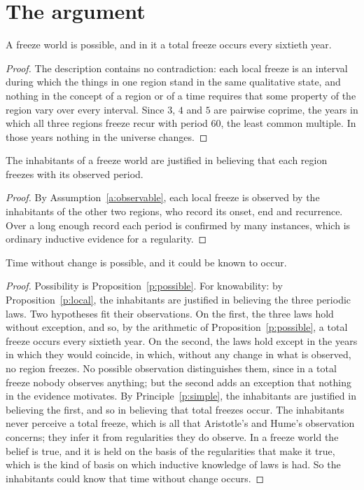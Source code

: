 \documentclass{situationist-preprint}
\begin{document}
\section{The argument}

\begin{proposition}\label{p:possible}
A freeze world is possible, and in it a total freeze occurs every sixtieth year.
\end{proposition}

\begin{proof}
The description contains no contradiction: each local freeze is an interval during which the things in one region stand in the same qualitative state, and nothing in the concept of a region or of a time requires that some property of the region vary over every interval. Since $3$, $4$ and $5$ are pairwise coprime, the years in which all three regions freeze recur with period $60$, the least common multiple. In those years nothing in the universe changes.
\end{proof}

\begin{proposition}\label{p:local}
The inhabitants of a freeze world are justified in believing that each region freezes with its observed period.
\end{proposition}

\begin{proof}
By Assumption~\ref{a:observable}, each local freeze is observed by the inhabitants of the other two regions, who record its onset, end and recurrence. Over a long enough record each period is confirmed by many instances, which is ordinary inductive evidence for a regularity.
\end{proof}

\begin{theorem}\label{t:main}
Time without change is possible, and it could be known to occur.
\end{theorem}

\begin{proof}
Possibility is Proposition~\ref{p:possible}. For knowability: by Proposition~\ref{p:local}, the inhabitants are justified in believing the three periodic laws. Two hypotheses fit their observations. On the first, the three laws hold without exception, and so, by the arithmetic of Proposition~\ref{p:possible}, a total freeze occurs every sixtieth year. On the second, the laws hold except in the years in which they would coincide, in which, without any change in what is observed, no region freezes. No possible observation distinguishes them, since in a total freeze nobody observes anything; but the second adds an exception that nothing in the evidence motivates. By Principle~\ref{p:simple}, the inhabitants are justified in believing the first, and so in believing that total freezes occur. The inhabitants never perceive a total freeze, which is all that Aristotle's and Hume's observation concerns; they infer it from regularities they do observe. In a freeze world the belief is true, and it is held on the basis of the regularities that make it true, which is the kind of basis on which inductive knowledge of laws is had. So the inhabitants could know that time without change occurs.
\end{proof}
\end{document}
